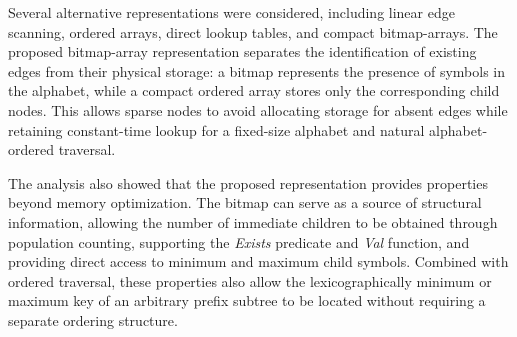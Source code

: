 \documentclass[pdflatex,sn-mathphys-num]{sn-jnl}%
\theoremstyle{thmstyleone}%
\theoremstyle{thmstyletwo}%
\theoremstyle{thmstylethree}%
\begin{document}
Several alternative representations were considered, including linear edge scanning, ordered arrays,
direct lookup tables, and compact bitmap-arrays. The proposed bitmap-array representation separates the
identification of existing edges from their physical storage: a bitmap represents the presence of symbols in the
alphabet, while a compact ordered array stores only the corresponding child nodes. This allows sparse nodes to
avoid allocating storage for absent edges while retaining constant-time lookup for a fixed-size alphabet
and natural alphabet-ordered traversal.

The analysis also showed that the proposed representation provides properties beyond memory optimization.
The bitmap can serve as a source of structural information, allowing the number of immediate children to be
obtained through population counting, supporting the \textit{Exists} predicate and \textit{Val} function, and providing
direct access to minimum and maximum child symbols. Combined with ordered traversal, these properties also allow the
lexicographically minimum or maximum key of an arbitrary prefix subtree to be located without requiring
a separate ordering structure.


\end{document}
